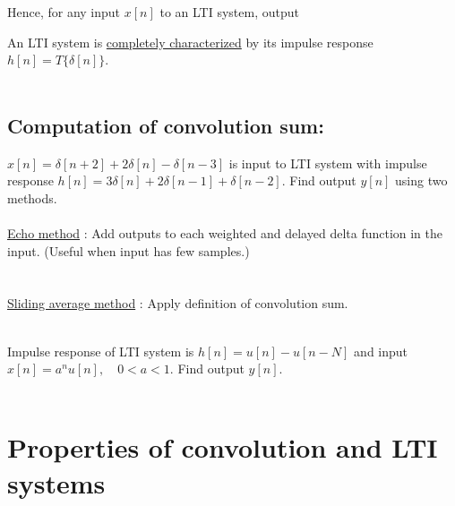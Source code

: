 \documentclass[10pt,a4paper,report]{report}       %
\begin{document}
Hence, for any input $x[n]$ to an LTI system, output \\
\vspace{2cm}

An LTI system is \underline{completely characterized} by its impulse response $h[n]=T\{\delta[n]\}$.
\vspace{4cm}\\
\vspace{4cm}\\

\subsection{Computation of convolution sum:}
\vspace{2cm}
\ex $x[n]=\delta[n+2]+2\delta[n]-\delta[n-3]$ is input to LTI system with impulse response $h[n]=3\delta[n]+2\delta[n-1]+\delta[n-2]$. Find output $y[n]$ using two methods.\\
\vspace{3cm}\\
\underline{Echo method} : Add outputs to each weighted and delayed delta function in the input. (Useful when input has few samples.)\\
\vspace{4cm}\\
\vspace{4cm}\\
\underline{Sliding average method} : Apply definition of convolution sum.\\
\vspace{4cm}\\
\vspace{4cm}

\ex Impulse response of LTI system is $h[n]=u[n]-u[n-N]$ and input $x[n]=a^nu[n], \quad 0<a<1$. Find output $y[n]$.\\
\vspace{3cm}\\
\vspace{4cm}


\section{Properties of convolution and LTI systems}
\end{document}
